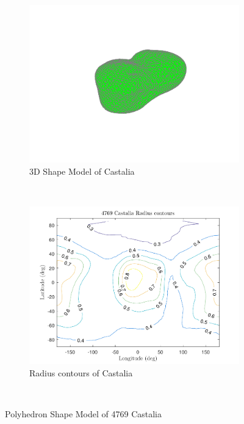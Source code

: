 \documentclass[]{aiaa-tc}%
\begin{document}
\begin{figure}
    \centering
    \begin{subfigure}[htbp]{0.45\textwidth}
        \includegraphics[width=\textwidth]{castalia}
        \caption{3D Shape Model of Castalia} \label{fig:castalia_3d}
    \end{subfigure}~ %
    \begin{subfigure}[htbp]{0.45\textwidth}
        \includegraphics[width=\textwidth]{radius_contour}
        \caption{Radius contours of Castalia} \label{fig:radius_contour}
    \end{subfigure} ~ %
    \caption{Polyhedron Shape Model of 4769 Castalia}
    \label{fig:castalia}
\end{figure}
\end{document}
